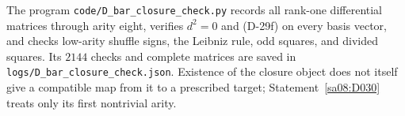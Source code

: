 The program \texttt{code/D\_bar\_closure\_check.py}
records all rank-one differential matrices through
arity eight, verifies \(d^2=0\) and (D-29f) on every
basis vector, and checks low-arity shuffle signs,
the Leibniz rule, odd squares, and divided squares.
Its \(2144\) checks and complete matrices are saved
in \texttt{logs/D\_bar\_closure\_check.json}.
Existence of the closure object does not itself give
a compatible map from it to a prescribed target;
Statement~\ref{sa08:D030} treats only its first nontrivial arity.
